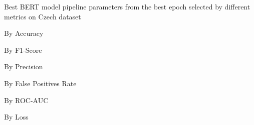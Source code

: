 \begin{table}[!htbp]
    \caption{Best BERT model pipeline parameters from the best epoch selected by different metrics on Czech dataset}
    \label{tab:czech_bert_pipeline_params}
    \centering

    \begin{subtable}[t]{0.48\linewidth}
        \scriptsize
        \caption{By Accuracy}
        
    \end{subtable}
    \hfill
    \begin{subtable}[t]{0.48\linewidth}
        \scriptsize
        \caption{By F1-Score}
        
    \end{subtable}

    \vspace{1em}

    \begin{subtable}[t]{0.48\linewidth}
        \scriptsize
        \caption{By Precision}
        
    \end{subtable}
    \hfill
    \begin{subtable}[t]{0.48\linewidth}
        \scriptsize
        \caption{By False Positives Rate}
        
    \end{subtable}

    \vspace{1em}

    \begin{subtable}[t]{0.48\linewidth}
        \scriptsize
        \caption{By ROC-AUC}
        
    \end{subtable}
    \hfill
    \begin{subtable}[t]{0.48\linewidth}
        \scriptsize
        \caption{By Loss}
        
    \end{subtable}

\end{table}